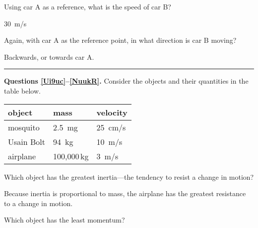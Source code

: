 \documentclass[dvipsnames]{exam}
\begin{document}
\begin{questions}
\begin{center}
\end{center}

\question \label{oXjxL}
Using car A as a reference, what is the speed of car B?

\begin{solution}
    \SI{30}{m/s}
\end{solution}

\question \label{io05f}
Again, with car A as the reference point, in what direction is car B moving?

\begin{solution}
    Backwards, or towards car A.
\end{solution}

\bigskip
\hrule

\begin{EnvUplevel}
    \textbf{Questions \ref{Ui9uc}--\ref{NuukR}.} Consider the objects and their quantities in the table below.
\end{EnvUplevel}

\begin{center}
    \begin{tabular}{|l|l|l|}
        \hline
        \textbf{object} & \textbf{mass} & \textbf{velocity} \\ \hline
        mosquito & \SI{2.5}{mg} & \SI{25}{cm/s} \\ \hline
        Usain Bolt & \SI{94}{kg} & \SI{10}{m/s}\\ \hline
        airplane & 100,000\,kg & \SI{3}{m/s}\\ \hline
    \end{tabular}
\end{center}

\question \label{Ui9uc}
Which object has the greatest inertia---the tendency to resist a change in motion?

\begin{solution}
    Because inertia is proportional to mass, the airplane has the greatest resistance to a change in motion.
\end{solution}

\question
Which object has the least momentum?


\end{questions}
\end{document}

